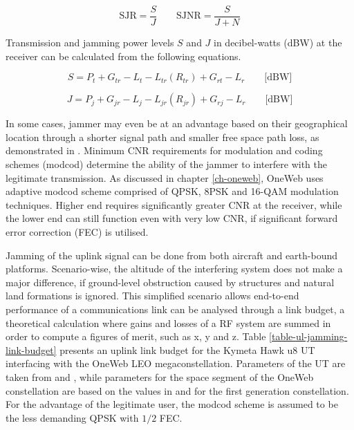 \documentclass[english, 12pt, a4paper, elec, utf8, a-1b, online]{aaltothesis}
\begin{document}
\begin{equation*}
  \text{SJR} = \frac{S}{J} \qquad
  \text{SJNR} = \frac{S}{J+N}
\end{equation*}

Transmission and jamming power levels $S$ and $J$ in decibel-watts (dBW) at the receiver can be calculated from the following equations.

\begin{equation} \label{eq-signal-power-full}
  S = P_t + G_{tr}-L_t-L_{tr}(R_{tr})+G_{rt}-L_r \qquad \text{[dBW]}
\end{equation}

\begin{equation}
  J = P_j + G_{jr}-L_j-L_{jr}(R_{jr})+G_{rj}-L_r \qquad \text{[dBW]}
\end{equation}

In some cases, jammer may even be at an advantage based on their geographical location through a shorter signal path and smaller free space path loss, as demonstrated in \cite{pavur2022defcon}.
Minimum CNR requirements for modulation and coding schemes (modcod) determine the ability of the jammer to interfere with the legitimate transmission.
As discussed in chapter \ref{ch-oneweb}, OneWeb uses adaptive modcod scheme comprised of QPSK, 8PSK and 16-QAM modulation techniques. Higher end requires significantly greater CNR at the receiver, while the lower end can still function even with very low CNR, if significant forward error correction (FEC) is utilised. \cite{allen2022terrestrial,etsi2012en302307}

Jamming of the uplink signal can be done from both aircraft and earth-bound platforms.
Scenario-wise, the altitude of the interfering system does not make a major difference, if ground-level obstruction caused by structures and natural land formations is ignored.
This simplified scenario allows end-to-end performance of a communications link can be analysed through a link budget, a theoretical calculation where gains and losses of a RF system are summed in order to compute a figures of merit, such as x, y and z.%
Table \ref{table-ul-jamming-link-budget} presents an uplink link budget for the Kymeta Hawk u8 UT interfacing with the OneWeb LEO megaconstellation.
Parameters of the UT are taken from \cite{kymeta2022hawk} and \cite{kymeta2020mod}, while parameters for the space segment of the OneWeb constellation are based on the values in \cite{worldvu2016loi} and \cite{allen2022terrestrial} for the first generation constellation.
For the advantage of the legitimate user, the modcod scheme is assumed to be the less demanding QPSK with $1/2$ FEC.
\end{document}
